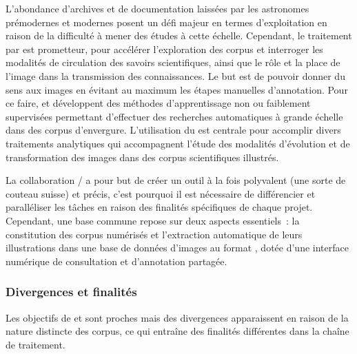 L'abondance d'archives et de documentation laissées par les astronomes
prémodernes et modernes posent un défi majeur en termes d'exploitation
en raison de la difficulté à mener des études à cette échelle.
Cependant, le traitement par \ia est
prometteur, pour accélérer l'exploration des corpus et interroger les
modalités de circulation des savoirs scientifiques, ainsi que le rôle et
la place de l'image dans la transmission des connaissances. Le but est
de pouvoir donner du sens aux images en évitant au maximum les étapes
manuelles d'annotation. Pour ce faire, \eida et \vhs développent des
méthodes d'apprentissage non ou faiblement supervisées permettant
d'effectuer des recherches automatiques à grande échelle dans des corpus
d'envergure. L'utilisation du \dl est centrale pour accomplir
divers traitements analytiques qui accompagnent l'étude des modalités
d'évolution et de transformation des images dans des corpus
scientifiques illustrés.

La collaboration \eida / \vhs a pour but de créer un outil à la fois
polyvalent (une sorte de couteau suisse) et précis, c'est pourquoi il
est nécessaire de différencier et paralléliser les tâches en raison des
finalités spécifiques de chaque projet. Cependant, une base commune
repose sur deux aspects essentiels~: la constitution des corpus
numérisés et l'extraction automatique de leurs illustrations dans une
base de données d'images au format \iiif, dotée d'une interface numérique
de consultation et d'annotation partagée.

\hypertarget{divergences-et-finalites}{%
\subsubsection{Divergences et finalités}\label{divergences-et-finalites}}

Les objectifs de \eida et \vhs sont proches mais des divergences
apparaissent en raison de la nature distincte des corpus, ce qui
entraîne des finalités différentes dans la chaîne de traitement.

